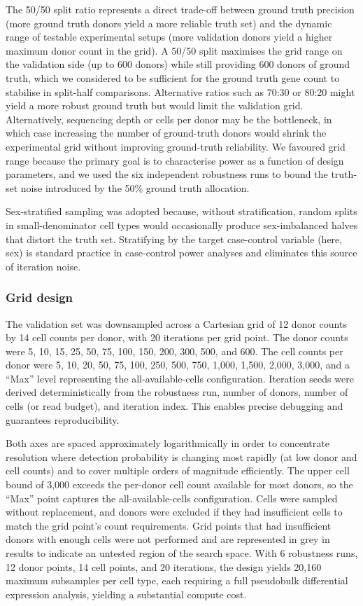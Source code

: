 \documentclass[
]{article}
\begin{document}
The 50/50 split ratio represents a direct trade-off between ground truth
precision (more ground truth donors yield a more reliable truth set) and
the dynamic range of testable experimental setups (more validation
donors yield a higher maximum donor count in the grid). A 50/50 split
maximises the grid range on the validation side (up to 600 donors) while
still providing 600 donors of ground truth, which we considered to be
sufficient for the ground truth gene count to stabilise in split-half
comparisons. Alternative ratios such as 70:30 or 80:20 might yield a
more robust ground truth but would limit the validation grid.
Alternatively, sequencing depth or cells per donor may be the
bottleneck, in which case increasing the number of ground-truth donors
would shrink the experimental grid without improving ground-truth
reliability. We favoured grid range because the primary goal is to
characterise power as a function of design parameters, and we used the
six independent robustness runs to bound the truth-set noise introduced
by the 50\% ground truth allocation.

Sex-stratified sampling was adopted because, without stratification,
random splits in small-denominator cell types would occasionally produce
sex-imbalanced halves that distort the truth set. Stratifying by the
target case-control variable (here, sex) is standard practice in
case-control power analyses and eliminates this source of iteration
noise.

\subsubsection{Grid design}\label{grid-design}

The validation set was downsampled across a Cartesian grid of 12 donor
counts by 14 cell counts per donor, with 20 iterations per grid point.
The donor counts were 5, 10, 15, 25, 50, 75, 100, 150, 200, 300, 500,
and 600. The cell counts per donor were 5, 10, 20, 50, 75, 100, 250,
500, 750, 1,000, 1,500, 2,000, 3,000, and a ``Max'' level representing
the all-available-cells configuration. Iteration seeds were derived
deterministically from the robustness run, number of donors, number of
cells (or read budget), and iteration index. This enables precise
debugging and guarantees reproducibility.

Both axes are spaced approximately logarithmically in order to
concentrate resolution where detection probability is changing most
rapidly (at low donor and cell counts) and to cover multiple orders of
magnitude efficiently. The upper cell bound of 3,000 exceeds the
per-donor cell count available for most donors, so the ``Max'' point
captures the all-available-cells configuration. Cells were sampled
without replacement, and donors were excluded if they had insufficient
cells to match the grid point's count requirements. Grid points that had
insufficient donors with enough cells were not performed and are
represented in grey in results to indicate an untested region of the
search space. With 6 robustness runs, 12 donor points, 14 cell points,
and 20 iterations, the design yields 20,160 maximum subsamples per cell
type, each requiring a full pseudobulk differential expression analysis,
yielding a substantial compute cost.
\end{document}

